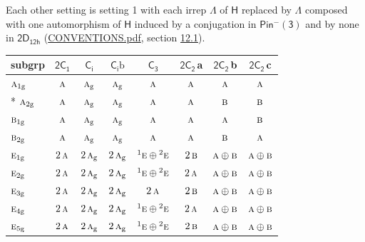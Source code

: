 \documentclass[10pt,a4paper]{article}
\numberwithin{equation}{section}
\newcommand{\grp}[1]{\mathsf{#1}}
\newcommand{\irr}[1]{\text{\normalfont\scshape #1}}
\newcommand{\conjpair}[1]{{}^{#1}}
\newcommand{\ptag}[1]{\mathrm{#1}}
\newcommand{\clsletter}[1]{\,{\scriptsize\color{black!55}#1}}
\newcommand{\secondclass}{\mathrm{b}}
\begin{document}
\label{n:irrep.Delta}Each other setting is setting 1 with each irrep $\Lambda$ of $\grp{H}$ replaced by $\Lambda$ composed with one automorphism of $\grp{H}$ induced by a conjugation in \href{Pinminus3.pdf}{$\grp{Pin^{-}(3)}$} and by none in $\grp{2D_{12h}}$ (\href{../../CONVENTIONS.pdf}{CONVENTIONS.pdf}, section \href{../../../rotation/CONVENTIONS.pdf\#conv.12.1}{12.1}).
{\small\begin{longtable}{@{}lccccccc@{}}\toprule
subgrp & \href{2C1.pdf}{$\grp{2C_{1}}$} & \href{S2.pdf}{$\grp{C_{i}}$} & \href{S2b.pdf}{$\grp{C_{i}}\secondclass$} & \href{C3.pdf}{$\grp{C_{3}}$} & \href{2C2.pdf}{$\grp{2C_{2}}$}\clsletter{a} & \href{2C2.pdf}{$\grp{2C_{2}}$}\clsletter{b} & \href{2C2.pdf}{$\grp{2C_{2}}$}\clsletter{c}\\\midrule\endhead
\bottomrule\endfoot\endlastfoot
$\irr{a}_{1\ptag{g}}$ & $\irr{a}$ & $\irr{a}_{\ptag{g}}$ & $\irr{a}_{\ptag{g}}$ & $\irr{a}$ & $\irr{a}$ & $\irr{a}$ & $\irr{a}$\\*
$\irr{a}_{2\ptag{g}}$ & $\irr{a}$ & $\irr{a}_{\ptag{g}}$ & $\irr{a}_{\ptag{g}}$ & $\irr{a}$ & $\irr{a}$ & $\irr{b}$ & $\irr{b}$\\
$\irr{b}_{1\ptag{g}}$ & $\irr{a}$ & $\irr{a}_{\ptag{g}}$ & $\irr{a}_{\ptag{g}}$ & $\irr{a}$ & $\irr{a}$ & $\irr{a}$ & $\irr{b}$\\
$\irr{b}_{2\ptag{g}}$ & $\irr{a}$ & $\irr{a}_{\ptag{g}}$ & $\irr{a}_{\ptag{g}}$ & $\irr{a}$ & $\irr{a}$ & $\irr{b}$ & $\irr{a}$\\
$\irr{e}_{1\ptag{g}}$ & $2\,\irr{a}$ & $2\,\irr{a}_{\ptag{g}}$ & $2\,\irr{a}_{\ptag{g}}$ & $\conjpair{1}\irr{e}\oplus \conjpair{2}\irr{e}$ & $2\,\irr{b}$ & $\irr{a}\oplus \irr{b}$ & $\irr{a}\oplus \irr{b}$\\
$\irr{e}_{2\ptag{g}}$ & $2\,\irr{a}$ & $2\,\irr{a}_{\ptag{g}}$ & $2\,\irr{a}_{\ptag{g}}$ & $\conjpair{1}\irr{e}\oplus \conjpair{2}\irr{e}$ & $2\,\irr{a}$ & $\irr{a}\oplus \irr{b}$ & $\irr{a}\oplus \irr{b}$\\
$\irr{e}_{3\ptag{g}}$ & $2\,\irr{a}$ & $2\,\irr{a}_{\ptag{g}}$ & $2\,\irr{a}_{\ptag{g}}$ & $2\,\irr{a}$ & $2\,\irr{b}$ & $\irr{a}\oplus \irr{b}$ & $\irr{a}\oplus \irr{b}$\\
$\irr{e}_{4\ptag{g}}$ & $2\,\irr{a}$ & $2\,\irr{a}_{\ptag{g}}$ & $2\,\irr{a}_{\ptag{g}}$ & $\conjpair{1}\irr{e}\oplus \conjpair{2}\irr{e}$ & $2\,\irr{a}$ & $\irr{a}\oplus \irr{b}$ & $\irr{a}\oplus \irr{b}$\\
$\irr{e}_{5\ptag{g}}$ & $2\,\irr{a}$ & $2\,\irr{a}_{\ptag{g}}$ & $2\,\irr{a}_{\ptag{g}}$ & $\conjpair{1}\irr{e}\oplus \conjpair{2}\irr{e}$ & $2\,\irr{b}$ & $\irr{a}\oplus \irr{b}$ & $\irr{a}\oplus \irr{b}$\\

\end{longtable}}
\end{document}
